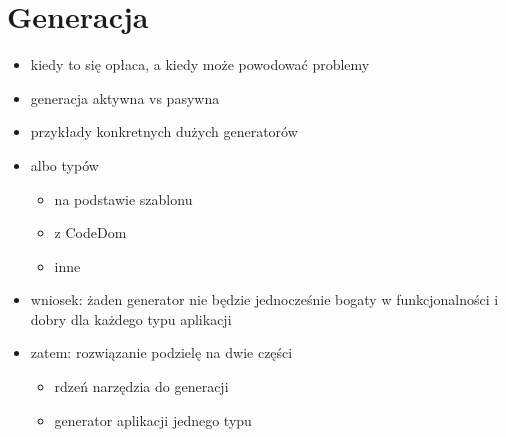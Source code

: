 \chapter{Generacja} \label{chap:generation}

\begin{itemize}
 \item kiedy to się opłaca, a kiedy może powodować problemy
 \item generacja aktywna vs pasywna
 \item przykłady konkretnych dużych generatorów
 \item albo typów
  \begin{itemize}
   \item na podstawie szablonu
   \item z CodeDom
   \item inne
  \end{itemize}
 \item wniosek: żaden generator nie będzie jednocześnie bogaty w funkcjonalności i dobry dla każdego typu aplikacji
 \item zatem: rozwiązanie podzielę na dwie części
  \begin{itemize}
   \item rdzeń narzędzia do generacji
   \item generator aplikacji jednego typu
  \end{itemize}
\end{itemize}
